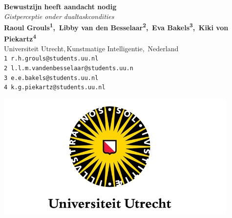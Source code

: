 \documentclass[a0,portrait]{a0poster}
\begin{document}


\begin{minipage}[b]{0.80\linewidth}
\large \color{NavyBlue} \textbf{Bewustzijn heeft aandacht nodig} \color{Black}\\ %
\large\textit{Gistperceptie onder dualtaskcondities}\\[2.4cm] %
\normalsize \textbf{Raoul Grouls\textsuperscript{1},
	\,Libby van den Besselaar\textsuperscript{2},
	\,Eva Bakels\textsuperscript{3},
	\,Kiki von Piekartz\textsuperscript{4}}\\[0.5cm] %
\small Universiteit Utrecht,\,Kunstmatige Intelligentie,\, Nederland\\[0.4cm] %
\small \texttt{1 r.h.grouls@students.uu.nl}\\
\texttt{2 l.l.m.vandenbesselaar@students.uu.n}\\
\texttt{3 e.e.bakels@students.uu.nl}\\
\texttt{4 k.g.piekartz@students.uu.nl}\\
\end{minipage}
%
\begin{minipage}[b]{0.3\linewidth}
\includegraphics[width=12cm]{uu-logo.png}\\ 
\end{minipage}

\vspace{1cm} %
\end{document}
